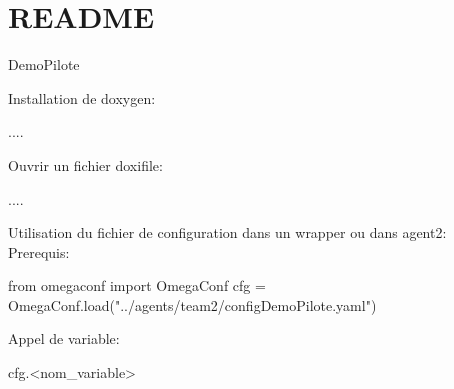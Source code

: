 \chapter{README}
\hypertarget{md_README}{}\label{md_README}
Demo\+Pilote

Installation de doxygen\+: \begin{DoxyVerb}....


Ouvrir un fichier doxifile:


    ....
\end{DoxyVerb}
 Utilisation du fichier de configuration dans un wrapper ou dans agent2\+: Prerequis\+: \begin{DoxyVerb}from omegaconf import OmegaConf
cfg = OmegaConf.load("../agents/team2/configDemoPilote.yaml")
\end{DoxyVerb}
 Appel de variable\+: \begin{DoxyVerb}cfg.<nom_variable>
\end{DoxyVerb}
 